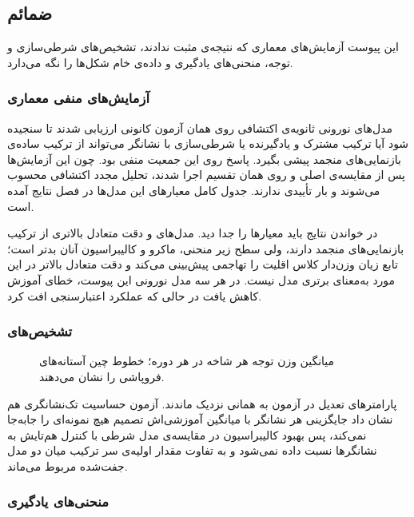 \subsection{ضمائم}

این پیوست آزمایش‌های معماری که نتیجه‌ی مثبت ندادند، تشخیص‌های شرطی‌سازی و توجه، منحنی‌های یادگیری و داده‌ی خام شکل‌ها را نگه می‌دارد.

\subsubsection{آزمایش‌های منفی معماری}

مدل‌های نورونی ثانویه‌ی اکتشافی روی همان آزمون کانونی ارزیابی شدند تا سنجیده شود آیا ترکیب مشترک و یادگیرنده یا شرطی‌سازی با نشانگر می‌تواند از ترکیب ساده‌ی بازنمایی‌های منجمد پیشی بگیرد. پاسخ روی این جمعیت منفی بود. چون این آزمایش‌ها پس از مقایسه‌ی اصلی و روی همان تقسیم اجرا شدند، تحلیل مجدد اکتشافی محسوب می‌شوند و بار تأییدی ندارند. جدول کامل معیارهای این مدل‌ها در فصل نتایج آمده است.

در خواندن نتایج باید معیارها را جدا دید. مدل‌های  و  دقت متعادل بالاتری از ترکیب بازنمایی‌های منجمد دارند، ولی سطح زیر منحنی،  ماکرو و کالیبراسیون آنان بدتر است؛ تابع زیان وزن‌دار کلاس اقلیت را تهاجمی پیش‌بینی می‌کند و دقت متعادل بالاتر در این مورد به‌معنای برتری مدل نیست. در هر سه مدل نورونی این پیوست، خطای آموزش کاهش یافت در حالی که عملکرد اعتبارسنجی افت کرد.

\subsubsection{تشخیص‌های }

\begin{figure}[htbp]
  \centering
  \caption{میانگین وزن توجه هر شاخه در هر دوره؛ خطوط چین آستانه‌های فروپاشی را نشان می‌دهند.}
  \label{fig:U50}
\end{figure}


پارامترهای تعدیل در آزمون به همانی نزدیک ماندند. آزمون حساسیت تک‌نشانگری هم نشان داد جایگزینی هر نشانگر با میانگین آموزشی‌اش تصمیم هیچ نمونه‌ای را جابه‌جا نمی‌کند، پس بهبود کالیبراسیون در مقایسه‌ی مدل شرطی با کنترل هم‌تایش به نشانگرها نسبت داده نمی‌شود و به تفاوت مقدار اولیه‌ی سر ترکیب میان دو مدل جفت‌شده مربوط می‌ماند.

\subsubsection{منحنی‌های یادگیری }



